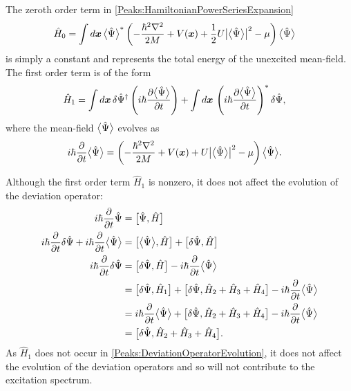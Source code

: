 The zeroth order term in \eqref{Peaks:HamiltonianPowerSeriesExpansion}
\begin{align}
    \hat{H}_0 &= \int d \bm{x}\, {\big<\hat{\Psi}\big>}^* \left( -\frac{\hbar^2 \nabla^2}{2M} + V(\bm{x}) + \frac{1}{2} U \big|{\big<\hat{\Psi}\big>}\big|^2 - \mu \right) {\big<\hat{\Psi}\big>}
\end{align}
is simply a constant and represents the total energy of the unexcited mean-field. The first order term is of the form
\begin{align}
    \hat{H}_1 &= \int d \bm{x}\, \delta \hat{\Psi}^\dagger \left(i \hbar \frac{\partial {\ensuremath{\big<\hat{\Psi}\big>}}}{\partial t} \right)  + \int d \bm{x}\, \left(i \hbar \frac{\partial {\ensuremath{\big<\hat{\Psi}\big>}}}{\partial t} \right)^* \delta \hat{\Psi},
\end{align}
where the mean-field ${\big<\hat{\Psi}\big>}$ evolves as
\begin{align}
    i \hbar \frac{\partial}{\partial t}{\big<\hat{\Psi}\big>} &= \left(-\frac{\hbar^2 \nabla^2}{2 M} + V(\bm{x}) + U \big| {\big<\hat{\Psi}\big>}\big|^2 - \mu \right) {\big<\hat{\Psi}\big>}.
\end{align}

Although the first order term $\hat{H}_1$ is nonzero, it does not affect the evolution of the deviation operator:
\begin{align}
    i \hbar \frac{\partial }{\partial t}\hat{\Psi} &= \comm{\hat{\Psi}, \hat{H}}\\
    i \hbar \frac{\partial }{\partial t}\delta{\hat{\Psi}} + i \hbar \frac{\partial }{\partial t}\mean{\hat{\Psi}} &= \comm{\mean{\hat{\Psi}}, \hat{H}} + \comm{\delta\hat{\Psi}, \hat{H}}\\
    i \hbar \frac{\partial }{\partial t}\delta \hat{\Psi} &= \comm{\delta \hat{\Psi}, \hat{H}} - i \hbar \frac{\partial }{\partial t} \mean{\hat{\Psi}}\\
    &= \comm{\delta \hat{\Psi}, \hat{H}_1} + \comm{\delta \hat{\Psi}, \hat{H}_2 + \hat{H}_3 + \hat{H}_4} - i \hbar \frac{\partial }{\partial t}\mean{\hat{\Psi}}\\
    &= i \hbar \frac{\partial }{\partial t}\mean{\hat{\Psi}} + \comm{\delta \hat{\Psi}, \hat{H}_2 + \hat{H}_3 + \hat{H}_4} - i \hbar \frac{\partial }{\partial t}\mean{\hat{\Psi}}\\
    &= \comm{\delta \hat{\Psi}, \hat{H}_2 + \hat{H}_3 + \hat{H}_4}. \label{Peaks:DeviationOperatorEvolution}
\end{align}
As $\hat{H}_1$ does not occur in \eqref{Peaks:DeviationOperatorEvolution}, it does not affect the evolution of the deviation operators and so will not contribute to the excitation spectrum.

